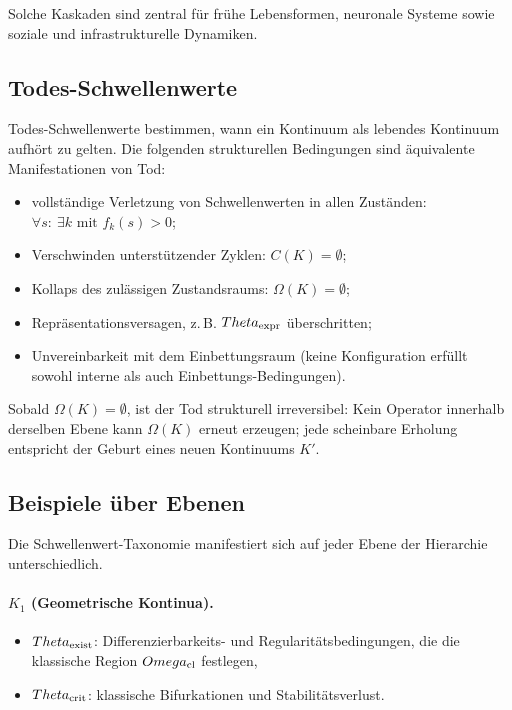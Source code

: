 Solche Kaskaden sind zentral für frühe Lebensformen, neuronale Systeme sowie
soziale und infrastrukturelle Dynamiken.

\subsection{Todes-Schwellenwerte}

Todes-Schwellenwerte bestimmen, wann ein Kontinuum als lebendes Kontinuum aufhört zu
gelten.
Die folgenden strukturellen Bedingungen sind äquivalente Manifestationen von Tod:
\begin{itemize}
    \item vollständige Verletzung von Schwellenwerten in allen Zuständen:
          \(\forall s:\ \exists k \text{ mit } f_k(s) > 0\);
    \item Verschwinden unterstützender Zyklen: \(C(K)=\emptyset\);
    \item Kollaps des zulässigen Zustandsraums: \(\Omega(K)=\emptyset\);
    \item Repräsentationsversagen, z.\,B. \(\Theta_{\rm expr}\) überschritten;
    \item Unvereinbarkeit mit dem Einbettungsraum (keine Konfiguration erfüllt
          sowohl interne als auch Einbettungs-Bedingungen).
\end{itemize}

Sobald \(\Omega(K)=\emptyset\), ist der Tod strukturell irreversibel:
Kein Operator innerhalb derselben Ebene kann \(\Omega(K)\) erneut erzeugen;
jede scheinbare Erholung entspricht der Geburt eines neuen Kontinuums \(K'\).

\subsection{Beispiele über Ebenen}

Die Schwellenwert-Taxonomie manifestiert sich auf jeder Ebene der Hierarchie unterschiedlich.

\paragraph{\texorpdfstring{\(K_1\)}{K_1} (Geometrische Kontinua).}
\begin{itemize}
    \item \(\Theta_{\rm exist}\): Differenzierbarkeits- und Regularitätsbedingungen,
          die die klassische Region \(\Omega_{\rm cl}\) festlegen,
    \item \(\Theta_{\rm crit}\): klassische Bifurkationen und Stabilitätsverlust.
\end{itemize}

